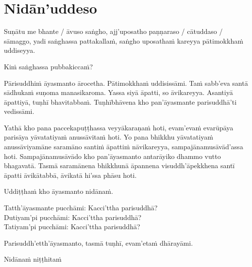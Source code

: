 \section{Nidān'uddeso}
\label{nidan'uddeso}

Suṇātu me bhante / āvuso saṅgho, ajj'uposatho paṇṇaraso / cātuddaso / sāmaggo, yadi saṅghassa pattakallaṁ, saṅgho uposathaṁ kareyya pātimokkhaṁ uddiseyya.

Kiṁ saṅghassa pubbakiccaṁ?

Pārisuddhiṁ āyasmanto ārocetha. Pātimokkhaṁ uddisissāmi. Taṁ sabb'eva santā sādhukaṁ suṇoma manasikaroma. Yassa siyā āpatti, so āvikareyya. Asantiyā āpattiyā, tuṇhī bhavitabbaṁ. Tuṇhībhāvena kho pan'āyasmante parisuddhā'ti vedissāmi.

Yathā kho pana paccekapuṭṭhassa veyyākaraṇaṁ hoti, evam'evaṁ evarūpāya parisāya yāvatatiyaṁ anussāvitaṁ hoti. Yo pana bhikkhu yāvatatiyaṁ anussāviyamāne saramāno santiṁ āpattiṁ nāvikareyya, sampajānamusāvād'assa hoti. Sampajānamusāvādo kho pan'āyasmanto antarāyiko dhammo vutto bhagavatā. Tasmā saramānena bhikkhunā āpannena visuddh'āpekkhena santī āpatti āvikātabbā, āvikatā hi'ssa phāsu hoti.

\medskip

\begin{center}
Uddiṭṭhaṁ kho āyasmanto nidānaṁ.\makeatletter\hyperlink{endnote8-appendix}\makeatother

\smallskip

Tatth'āyasmante pucchāmi: Kacci'ttha parisuddhā?\\
Dutiyam'pi pucchāmi: Kacci'ttha parisuddhā?\\
Tatiyam'pi pucchāmi: Kacci'ttha parisuddhā?

\smallskip

Parisuddh'etth'āyasmanto, tasmā tuṇhī, evam'etaṁ dhārayāmi.
\end{center}

\begin{outro}
  Nidānaṁ niṭṭhitaṁ\makeatletter\hyperlink{endnote9-appendix}\makeatother
\end{outro}

\clearpage
